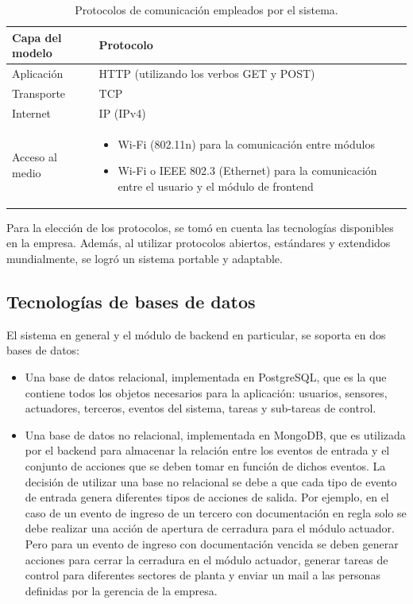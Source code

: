 \begin{table}[h]
	\centering
	\caption[Protocolos comunicación empleados por el sistema]{Protocolos de comunicación empleados por el sistema.}
	\begin{tabular}{p{3.5cm} p{8.5cm} } 	

		\toprule
		\textbf{Capa del modelo} & 
		\textbf{Protocolo}
		\\
		\midrule

Aplicación & HTTP (utilizando los verbos GET y POST)\\ 
Transporte & TCP\\
Internet & IP (IPv4)\\
Acceso al medio &
\begin{itemize}
\item Wi-Fi (802.11n) para la comunicación entre módulos
\item Wi-Fi o IEEE 802.3 (Ethernet) para la comunicación entre el usuario y el módulo de frontend
\end{itemize} \\



		\bottomrule
		\hline
	\end{tabular}
	\label{tab:protocolosComunicacionCap3}
\end{table}

Para la elección de los protocolos, se tomó en cuenta las tecnologías disponibles en la empresa. Además, al utilizar protocolos abiertos, estándares y extendidos mundialmente, se logró un sistema portable y adaptable.

\pagebreak
\subsection{Tecnologías de bases de datos}

El sistema en general y el módulo de backend en particular, se soporta en dos bases de datos:

\begin{itemize}
\item Una base de datos relacional, implementada en PostgreSQL, que es la que contiene todos los objetos necesarios para la aplicación: usuarios, sensores, actuadores, terceros, eventos del sistema, tareas y sub-tareas de control. 
\item Una base de datos no relacional, implementada en MongoDB, que es utilizada por el backend para almacenar la relación entre los eventos de entrada y el conjunto de acciones que se deben tomar en función de dichos eventos. La decisión de utilizar una base no relacional se debe a que cada tipo de evento de entrada genera diferentes tipos de acciones de salida. Por ejemplo, en el caso de un evento de ingreso de un tercero con documentación en regla solo se debe realizar una acción de apertura de cerradura para el módulo actuador. Pero para un evento de ingreso con documentación vencida se deben generar acciones para cerrar la cerradura en el módulo actuador, generar tareas de control para diferentes sectores de planta y enviar un mail a las personas definidas por la gerencia de la empresa. 

\end{itemize}

